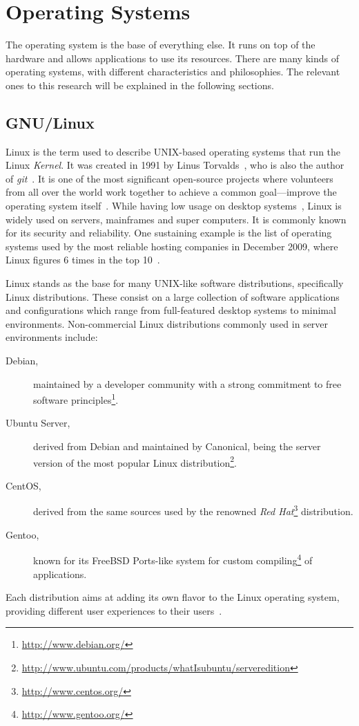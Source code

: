 \section{Operating Systems}
\label{tech:sec:operating_systems}
The operating system is the base of everything else. It runs on top of the hardware and allows applications to use its resources. There are many kinds of operating systems, with different characteristics and philosophies. The relevant ones to this research will be explained in the following sections.

\subsection{GNU/Linux}
Linux is the term used to describe UNIX-based operating systems that run the Linux \textit{Kernel}. It was created in 1991 by Linus Torvalds~\cite{linux_kernel_evolution}, who is also the author of \textit{git}~\cite{pro_git}. It is one of the most significant open-source projects where volunteers from all over the world work together to achieve a common goal---improve the operating system itself~\cite{linux_kernel_evolution}. While having low usage on desktop systems~\cite{w3counter}, Linux is widely used on servers, mainframes and super computers. It is commonly known for its security and reliability. One sustaining example is the list of operating systems used by the most reliable hosting companies in December 2009, where Linux figures 6 times in the top 10~\cite{netcraft_dec2009}.

Linux stands as the base for many UNIX-like software distributions, specifically Linux distributions. These consist on a large collection of software applications and configurations which range from full-featured desktop systems to minimal environments. Non-commercial Linux distributions commonly used in server environments include:
\begin {description}
\item[Debian,] maintained by a developer community with a strong commitment to free software principles\footnote{\url{http://www.debian.org/}}.
\item[Ubuntu Server,] derived from Debian and maintained by Canonical, being the server version of the most popular Linux distribution\footnote{\url{http://www.ubuntu.com/products/whatIsubuntu/serveredition}}.
\item[CentOS,] derived from the same sources used by the renowned \textit{Red Hat}\footnote{\url{http://www.centos.org/}} distribution.
\item[Gentoo,] known for its FreeBSD Ports-like system for custom compiling\footnote{\url{http://www.gentoo.org/}} of applications.
\end{description}
Each distribution aims at adding its own flavor to the Linux operating system, providing different user experiences to their users~\cite{tuning_costumizing_linux}.


